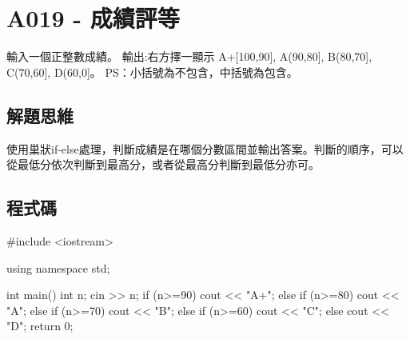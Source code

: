 \section{A019 - 成績評等}
輸入一個正整數成績。 輸出:右方擇一顯示 A+[100,90], A(90,80], B(80,70], C(70,60], D(60,0]。
PS：小括號為不包含，中括號為包含。

\subsection{解題思維}
使用巢狀if-else處理，判斷成績是在哪個分數區間並輸出答案。判斷的順序，可以從最低分依次判斷到最高分，或者從最高分判斷到最低分亦可。
\subsection{程式碼}
\begin{cppcode}
	#include <iostream>
	
	using namespace std;
	
	int main()
	{
		int n;
		cin >> n;
		if (n>=90) cout << "A+";
		else if (n>=80) cout << "A";
		else if (n>=70) cout << "B";
		else if (n>=60) cout << "C";
		else cout << "D";
		return 0;
	}
\end{cppcode}

